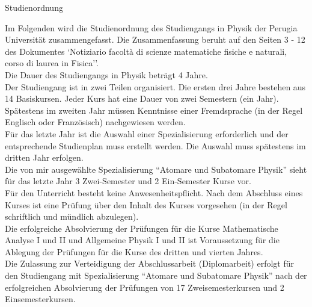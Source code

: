 \documentclass[a4paper,11pt]{article}
\begin{document}
\pagestyle{empty}
\begin{center}
  \huge{Studienordnung}
\end{center}
\vspace{1cm}

Im Folgenden wird die Studienordnung des Studiengangs in Physik der
Perugia Universit\"at zusammengefasst. Die Zusammenfassung beruht auf den Seiten 3 - 12 des
Dokumentes `Notiziario facolt\`a di scienze matematiche fisiche e naturali,
corso di laurea in Fisica''.\\

Die Dauer des Studiengangs in Physik betr\"agt 4 Jahre.\\

Der Studiengang ist in zwei Teilen organisiert. Die ersten drei Jahre bestehen
aus 14 Basiskursen. Jeder Kurs hat eine Dauer von zwei Semestern (ein
Jahr).\\

Sp\"atestens im zweiten Jahr m\"ussen Kenntnisse einer Fremdsprache (in der Regel
Englisch oder Franz\"osisch) nachgewiesen werden.\\

F\"ur das letzte Jahr ist die Auswahl einer Spezialisierung erforderlich und der
entsprechende Studienplan muss erstellt werden. Die Auswahl muss sp\"atestens im 
dritten Jahr erfolgen.\\

Die von mir ausgew\"ahlte Spezialisierung ``Atomare und Subatomare Physik''
sieht f\"ur das letzte Jahr 3 Zwei-Semester und 2 Ein-Semester Kurse vor.
\\

F\"ur den Unterricht besteht keine Anwesenheitspflicht. Nach dem Abschluss eines Kurses
ist eine Pr\"ufung \"uber den Inhalt des Kurses vorgesehen (in der Regel schriftlich  und  m\"undlich abzulegen).\\

Die erfolgreiche Absolvierung der Pr\"ufungen f\"ur die Kurse Mathematische Analyse I und II und
Allgemeine Physik I und II ist Voraussetzung f\"ur die Ablegung der Pr\"ufungen f\"ur die Kurse
des dritten und vierten Jahres.\\

Die Zulassung zur Verteidigung der Abschlussarbeit (Diplomarbeit) erfolgt f\"ur
den Studiengang mit Spezialisierung ``Atomare und Subatomare Physik'' nach der
erfolgreichen Absolvierung der Pr\"ufungen von 17 Zweisemesterkursen und 2
Einsemesterkursen.\\
\end{document}
